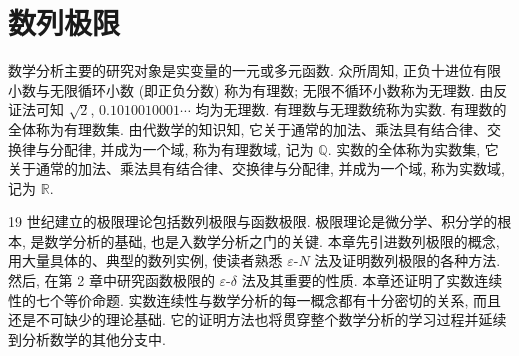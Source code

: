 
\chapter{数列极限}\label{ch:1}

数学分析主要的研究对象是实变量的一元或多元函数. 众所周知, 正负十进位有限小数与无限循环小数 (即正负分数) 称为有理数; 无限不循环小数称为无理数. 由反证法可知 $\sqrt{2}$, $0.1010010001\cdots$ 均为无理数. 有理数与无理数统称为实数. 有理数的全体称为有理数集. 由代数学的知识知, 它关于通常的加法、乘法具有结合律、交换律与分配律, 并成为一个域, 称为有理数域, 记为 $\mathbb{Q}$. 实数的全体称为实数集, 它关于通常的加法、乘法具有结合律、交换律与分配律, 并成为一个域, 称为实数域, 记为 $\mathbb{R}$.

19 世纪建立的极限理论包括数列极限与函数极限. 极限理论是微分学、积分学的根本, 是数学分析的基础, 也是入数学分析之门的关键. 本章先引进数列极限的概念, 用大量具体的、典型的数列实例, 使读者熟悉 $\varepsilon\text{-}N$ 法及证明数列极限的各种方法. 然后, 在第 2 章中研究函数极限的 $\varepsilon\text{-}\delta$ 法及其重要的性质. 本章还证明了实数连续性的七个等价命题. 实数连续性与数学分析的每一概念都有十分密切的关系, 而且还是不可缺少的理论基础. 它的证明方法也将贯穿整个数学分析的学习过程并延续到分析数学的其他分支中.








